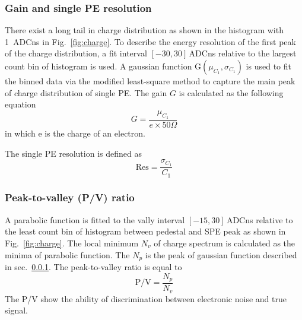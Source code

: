 \subsubsection{Gain and single PE resolution}
\label{sec:noisegain}
There exist a long tail in charge distribution as shown in the histogram with \SI{1}{ADCns} in Fig.~\ref{fig:charge}. To describe the energy resolution of the first peak of the charge distribution, a fit interval $[-30, 30]$\,ADCns relative to the largest count bin of histogram is used. A gaussian function G$(\mu_{C_1},\sigma_{C_1})$ is used to fit the binned data via the modified least-square method to capture the main peak of charge distribution of single PE. The gain $G$ is calculated as the following equation
\begin{equation}
    G=\frac{\mu_{C_1}}{e\times 50\Omega}
\end{equation}
in which e is the charge of an electron.

The single PE resolution is defined as
\begin{equation}
    \mathrm{Res}=\frac{\sigma_{C_1}}{C_1}
\end{equation}
\subsubsection{Peak-to-valley (P/V) ratio}
A parabolic function is fitted to the vally interval $[-15, 30]$\,ADCns relative to the least count bin of histogram between pedestal and SPE peak as shown in Fig.~\ref{fig:charge}. The local minimum $N_v$ of charge spectrum is calculated as the minima of parabolic function. The $N_p$ is the peak of gaussian function described in sec.~\ref{sec:noisegain}. The peak-to-valley ratio is equal to  
\begin{equation}
    \mathrm{P/V}=\frac{N_p}{N_v}
\end{equation}
The P/V show the ability of discrimination between electronic noise and true signal.
